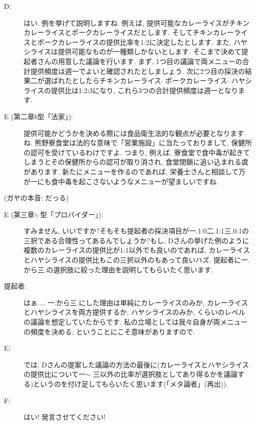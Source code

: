\documentclass[10pt,b5jsbook,dvips,dvipdfmx,openany]{jsbook}
\theoremstyle{definition}
\begin{document}
\begin{multicols}{2}
\begin{description}
		\item[D: ]はい. 例を挙げて説明しますね. 例えば, 提供可能なカレーライスがチキンカレーライスとポークカレーライスだとします. そしてチキンカレーライスとポークカレーライスの提供比率を1:2に決定したとします. また, ハヤシライスは提供可能なものが一種類しかないとします. そこまで決めて提起者さんの用意した議論を行います. まず, 1つ目の議論で両メニューの合計提供頻度は週一でよいと確認されたとしましょう. 次に2つ目の採決の結果二が選ばれたとしたらチキンカレーライス$ \cdot $ ポークカレーライス$ \cdot $ ハヤシライスの提供比は1:2:3になり, これら3つの合計提供頻度は週一となります. 

		\item[E (第二章$b$型「法家」): ]提供可能かどうかを決める際には食品衛生法的な観点が必要となりますね. 熊野寮食堂は法的な意味で「営業施設」に当たっておりまして, 保健所の認可を受けているわけですよ. つまり, 例えば, 寮食堂で食中毒が起きてしまうとその保健所からの認可が取り消され, 食堂閉鎖に追い込まれる虞があります. 新たにメニューを作るのであれば, 栄養士さんと相談して万が一にも食中毒を起こさないようなメニューが望ましいですね. 

		\end{description}

		(ガヤの本音: だっる)

		\begin{description}

		\item[E (第三章$ \gamma $ 型「プロバイダー」): ]すみません, いいですか?そもそも提起者の採決項目が一.1:0二.1:1三.0:1の三択である合理性ってあるんでしょうか?もし, Dさんの挙げた例のように複数のカレーライスの提供比が1:1以外でも良いのであれば, カレーライスとハヤシライスの提供比もこの三択以外のもあって良いハズ. 提起者に一.から三.の選択肢に絞った理由を説明してもらいたく思います. 

		\item[提起者: ]はぁ.... 一.から三.にした理由は単純にカレーライスのみか, カレーライスとハヤシライスを両方提供するか, ハヤシライスのみか, くらいのレベルの議論を想定していたからです. 私の立場としては我々自身が両メニューの頻度を決める, ということにこそ意味がありますので. 

		\item[E: ]では, Dさんの提案した議論の方法の最後に(カレーライスとハヤシライスの提供比について一$ \sim $ 三以外の比率が選択肢としてあり得るかを議論する)というのを付け足してもらいたく思います(「メタ論者」(再出)). 

		\item[F: ]はい! 発言させてください! 


\end{description}
\end{multicols}
\end{document}
